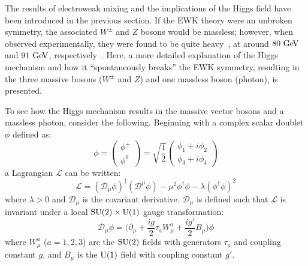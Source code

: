 ﻿%

The results of electroweak mixing and the implications of the Higgs field have been introduced in the previous section.
If the EWK theory were an unbroken symmetry, the associated $W^{\pm}$ and $Z$ bosons would be massless; however, when observed experimentally, they were found to be quite heavy~\cite{1983.w-boson, 1983.z-boson}, at around $80\gev$ and $91\gev$, respectively~\cite{2014.pdg}.
Here, a more detailed explanation of the Higgs mechanism and how it ``spontaneously breaks'' the EWK symmetry, resulting in the three massive bosons ($W^\pm$ and $Z$) and one massless boson (photon), is presented.

To see how the Higgs mechanism results in the massive vector bosons and a massless photon, consider the following.
Beginning with a complex scalar doublet $\phi$ defined as:
\begin{equation}
  \phi = 
  \begin{pmatrix}
    \phi^{+} \\
    \phi^{0}
  \end{pmatrix}
  = \sqrt{\frac{1}{2}}
  \begin{pmatrix}
    \phi_1 + i\phi_2 \\
    \phi_3 + i\phi_4
  \end{pmatrix}
  \label{eq:complex_scalar_doublet}
\end{equation}
a Lagrangian $\mathcal{L}$ can be written:
\begin{equation}
  \mathcal{L} = (\mathcal{D}_\mu\phi)^\dagger (\mathcal{D}^\mu\phi) - \mu^2\phi^{\dagger}\phi-\lambda (\phi^{\dagger}\phi)^2
  \label{eq:complex_scalar_lagrangian}
\end{equation}
where $\lambda > 0$ and $\mathcal{D}_{\mu}$ is the covariant derivative.
$\mathcal{D}_\mu$ is defined such that $\mathcal{L}$ is invariant under a local $\textrm{SU}(2)\times\textrm{U}(1)$ gauge transformation:
\begin{equation}
  \mathcal{D}_{\mu}\phi = \bigg(\partial_{\mu} + \frac{ig}{2}\tau_a W_{\mu}^a + \frac{ig'}{2}B_{\mu}\bigg)\phi
  \label{eq:covariant_deriv}
\end{equation}
where $W_{\mu}^a$ ($a=1,2,3$) are the $\textrm{SU}(2)$ fields with generators $\tau_a$ and coupling constant $g$, and $B_{\mu}$ is the $\textrm{U}(1)$ field with coupling constant $g'$.

